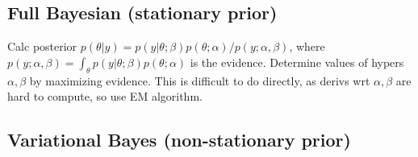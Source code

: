 \documentclass[11pt]{article}
\begin{document}
\begin{appendices}
\subsection{Full Bayesian (stationary prior)}
Calc posterior
$p(\theta | y) = p(y | \theta ; \beta) p(\theta ; \alpha) / p(y ; \alpha, \beta)$, where
$p(y ; \alpha, \beta) = \int_\theta p(y | \theta ; \beta) p(\theta ; \alpha)$ is the
evidence. Determine values of hypers $\alpha, \beta$ by maximizing evidence. This is
difficult to do directly, as derivs wrt $\alpha, \beta$ are hard to compute, so use EM
algorithm.

\subsection{Variational Bayes (non-stationary prior)}

\end{appendices}
\end{document}

